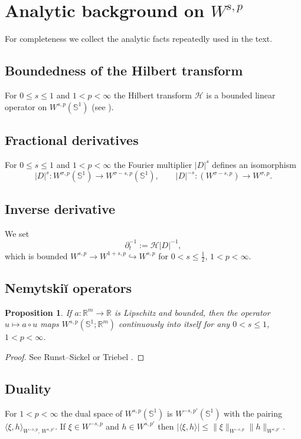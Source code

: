 \documentclass{amsart}
\newcounter{thm}
\newcounter{ex}
\newcounter{re}
\newtheorem{proposition}[thm]{Proposition}
\begin{document}
\newpage
\appendix
\section{Analytic background on \(W^{s,p}\)}\label{app:analytic}

For completeness we collect the analytic facts repeatedly used in the text.

\subsection{Boundedness of the Hilbert transform}
For \(0\le s\le1\) and \(1<p<\infty\) the Hilbert transform
\(\mathcal H\) is a bounded linear operator on \(W^{s,p}(\mathbb S^{1})\)
(see \cite[Th.~III.3]{SteinSI}).

\subsection{Fractional derivatives}
For \(0\le s\le1\) and \(1<p<\infty\) the Fourier multiplier
\(|D|^{s}\) defines an isomorphism
\[
|D|^{s}:W^{\sigma,p}(\mathbb S^{1})\longrightarrow
          W^{\sigma-s,p}(\mathbb S^{1}),
\qquad
|D|^{-s}:(W^{\sigma-s,p})\to W^{\sigma,p}.
\]

\subsection{Inverse derivative}
We set
\[
\partial_{t}^{-1}:=\mathcal H|D|^{-1},
\]
which is bounded
\(W^{s,p}\to W^{1+s,p}\hookrightarrow W^{s,p}\) for
\(0<s\le\tfrac12\), \(1<p<\infty\).

\subsection{Nemytskiĭ operators}
\begin{proposition}\label{prop:nemytskii}
If \(a:\mathbb R^{m}\to\mathbb R\) is Lipschitz and bounded, then the
operator \(u\mapsto a\circ u\) maps \(W^{s,p}(\mathbb S^{1};\mathbb R^{m})\)
continuously into itself for any \(0<s\le1\), \(1<p<\infty\).
\end{proposition}
\begin{proof}
See Runst–Sickel \cite[Ch.~4]{RunstSickel} or Triebel \cite[Th.~2.5.12]{Triebel}.
\end{proof}

\subsection{Duality}
For \(1<p<\infty\) the dual space of \(W^{s,p}(\mathbb S^{1})\) is
\(W^{-s,p'}(\mathbb S^{1})\) with the pairing
\(\langle\xi,h\rangle_{W^{-s,p},\,W^{s,p'}}\).
If \(\xi\in W^{-s,p}\) and \(h\in W^{s,p'}\) then
\(|\langle\xi,h\rangle|\le\|\xi\|_{W^{-s,p}}\|h\|_{W^{s,p'}}\).
\end{document}
